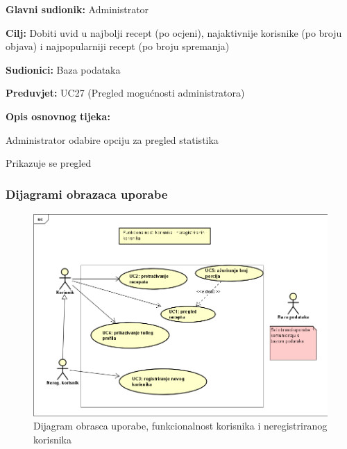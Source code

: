 					\noindent {}
					\begin{packed_item}
						
						\item \textbf{Glavni sudionik: }Administrator
						\item \textbf{Cilj: }Dobiti uvid u najbolji recept (po ocjeni), najaktivnije korisnike (po broju objava) i najpopularniji recept (po broju spremanja)
						\item \textbf{Sudionici: }Baza podataka
						\item \textbf{Preduvjet: }UC27 (Pregled mogućnosti administratora)
						\item \textbf{Opis osnovnog tijeka:}
						
						\item[] \begin{packed_enum}
							\item Administrator odabire opciju za pregled statistika
							\item Prikazuje se pregled
						\end{packed_enum}
					\end{packed_item}
				
					
				\subsubsection{Dijagrami obrazaca uporabe}
					
					\begin{figure}[H]
						\includegraphics[scale=0.5]{slike/UC_nereg.png} %
						\centering
						\caption{Dijagram obrasca uporabe, funkcionalnost korisnika i neregistriranog korisnika}
						\label{fig:UC_diagram1}
					\end{figure}

